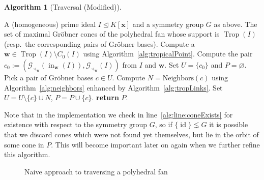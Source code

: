 \documentclass[
  paper=a4,
  titlepage,
  bibliography=totoc,
  pagesize=pdftex
]{scrartcl}
\numberwithin{figure}{section}
\numberwithin{equation}{section}
\numberwithin{table}{section}
\let\vec\mathbf
\let\idealof\trianglelefteq
\DeclareMathOperator{\Trop}{Trop}
\DeclareMathOperator{\initial}{in}
\DeclareMathOperator{\id}{id}
\theoremstyle{definition}
\newtheorem{algo}[definition]{Algorithm}
\numberwithin{definition}{section}
\begin{document}
\begin{algo}[Traversal (Modified)]\
  \label{alg:traversalMod}
  \begin{algorithmic}[1]
    \Require A (homogeneous) prime ideal $I \idealof K[\vec x]$ and a symmetry group $G$
      as above.
    \Ensure The set of maximal Gröbner cones of the polyhedral fan whose support is
      $\Trop(I)$ (resp.\ the corresponding pairs of Gröbner bases).
    \State Compute a $\vec w \in \Trop(I) \setminus C_0(I)$ using
      Algorithm~\ref{alg:tropicalPoint}.
    \State Compute the pair $c_0 := (\mathcal G_{\prec_{\vec w}}(\initial_{\vec w}(I)),
      \mathcal G_{\prec_{\vec w}}(I))$ from $I$ and $\vec w$.
    \State Set $U = \{ c_0 \}$ and $P = \varnothing$.
      \State Pick a pair of Gröbner bases $c \in U$.
       \label{alg:line:coneExists}
        \State Compute $N = \mathrm{Neighbors}(c)$ using Algorithm~\ref{alg:neighbors}
          enhanced by Algorithm~\ref{alg:tropLinks}.
        \State Set $U = U \setminus \{ c \} \cup N$, $P = P \cup \{ c \}$.
      \EndIf
    \EndWhile
    \State\textbf{return} $P$.
  \end{algorithmic}
\end{algo}

Note that in the implementation we check in line~\ref{alg:line:coneExists} for existence
with respect to the symmetry group $G$, so if $\{ \id \} \lneq G$ it is possible that we
discard cones which were not found yet themselves, but lie in the orbit of some cone in
$P$. This will become important later on again when we further refine this algorithm.

\begin{figure}[tbhp]
  \centering
  \caption{Naive approach to traversing a polyhedral fan}
  \label{fig:naive}
\end{figure}
\end{document}
